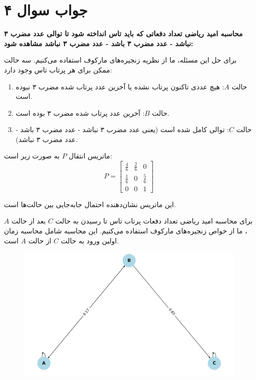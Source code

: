 \section*{جواب سوال ۴}

\textbf{محاسبه امید ریاضی تعداد دفعاتی که باید تاس انداخته شود تا توالی عدد مضرب ۳ نباشد - عدد مضرب ۳ باشد - عدد مضرب ۳ نباشد مشاهده شود:}

برای حل این مسئله، ما از نظریه زنجیره‌های مارکوف استفاده می‌کنیم. سه حالت ممکن برای هر پرتاب تاس وجود دارد:

\begin{enumerate}
	\item حالت \(A\): هیچ عددی تاکنون پرتاب نشده یا آخرین عدد پرتاب شده مضرب ۳ نبوده است.
	\item حالت \(B\): آخرین عدد پرتاب شده مضرب ۳ بوده است.
	\item حالت \(C\): توالی کامل شده است (یعنی عدد مضرب ۳ نباشد - عدد مضرب ۳ باشد - عدد مضرب ۳ نباشد).
\end{enumerate}

ماتریس انتقال \(P\) به صورت زیر است:
\[ P = \begin{bmatrix}
	\frac{4}{6} & \frac{2}{6} & 0 \\
	\frac{1}{6} & 0 & \frac{5}{6} \\
	0 & 0 & 1
\end{bmatrix} \]

این ماتریس نشان‌دهنده احتمال جابه‌جایی بین حالت‌ها است.

برای محاسبه امید ریاضی تعداد دفعات پرتاب تاس تا رسیدن به حالت \(C\) بعد از حالت \(A\)، ما از خواص زنجیره‌های مارکوف استفاده می‌کنیم. این محاسبه شامل محاسبه زمان اولین ورود به حالت \(C\) از حالت \(A\) است.



\begin{figure}[H]
	\centering
	\includegraphics{pic2.jpg}
	\label{fig:label4}
\end{figure}